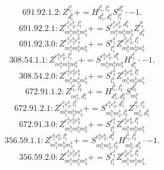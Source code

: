 \documentclass[letterpaper,10pt,fleqn,leqno,onecolumn]{article}
\begin{document}
\begin{equation} \;\;\;\;\;\;  691.92.1.2: Z^{l_{1}^{b}}_{d_{1}^{b}}+=H^{l_{1}^{b},l_{1}^{a}}_{d_{1}^{b},d_{1}^{a}}S^{d_{1}^{a}}_{l_{1}^{a}}\cdot -1. \end{equation}
\begin{equation} \;\;\;\;\;\;  691.92.2.1: Z^{e_{1}^{b}e_{2}^{b},l_{1}^{b}}_{m_{1}^{b}m_{2}^{b}m_{3}^{b}}+=S^{e_{1}^{b}e_{2}^{b},d_{1}^{b}}_{m_{1}^{b}m_{2}^{b}m_{3}^{b}}Z^{l_{1}^{b}}_{d_{1}^{b}} \end{equation}
\begin{equation} \;\;\;\;\;\;  691.92.3.0: Z^{e_{1}^{b}e_{2}^{b}e_{3}^{b}}_{m_{1}^{b}m_{2}^{b}m_{3}^{b}}+=S^{e_{1}^{b}}_{l_{1}^{b}}Z^{e_{2}^{b}e_{3}^{b},l_{1}^{b}}_{m_{1}^{b}m_{2}^{b}m_{3}^{b}} \end{equation}
\begin{equation} \;\;\;\;\;\;  308.54.1.1: Z^{e_{1}^{b}e_{2}^{b},l_{1}^{b}}_{m_{1}^{b}m_{2}^{b}m_{3}^{b}}+=S^{e_{1}^{b}e_{2}^{b},d_{1}^{b}}_{m_{1}^{b}m_{2}^{b}m_{3}^{b}}H^{l_{1}^{b}}_{d_{1}^{b}}\cdot -1. \end{equation}
\begin{equation} \;\;\;\;\;\;  308.54.2.0: Z^{e_{1}^{b}e_{2}^{b}e_{3}^{b}}_{m_{1}^{b}m_{2}^{b}m_{3}^{b}}+=S^{e_{1}^{b}}_{l_{1}^{b}}Z^{e_{2}^{b}e_{3}^{b},l_{1}^{b}}_{m_{1}^{b}m_{2}^{b}m_{3}^{b}} \end{equation}
\begin{equation} \;\;\;\;\;\;  672.91.1.2: Z^{l_{1}^{b},l_{2}^{b}}_{m_{1}^{b},d_{1}^{b}}+=H^{l_{1}^{b},l_{2}^{b}}_{d_{1}^{b},d_{2}^{b}}S^{d_{2}^{b}}_{m_{1}^{b}} \end{equation}
\begin{equation} \;\;\;\;\;\;  672.91.2.1: Z^{e_{1}^{b}e_{2}^{b},l_{1}^{b}}_{m_{1}^{b}m_{2}^{b}m_{3}^{b}}+=S^{e_{1}^{b}e_{2}^{b},d_{1}^{b}}_{m_{1}^{b}m_{2}^{b},l_{2}^{b}}Z^{l_{1}^{b},l_{2}^{b}}_{m_{3}^{b},d_{1}^{b}} \end{equation}
\begin{equation} \;\;\;\;\;\;  672.91.3.0: Z^{e_{1}^{b}e_{2}^{b}e_{3}^{b}}_{m_{1}^{b}m_{2}^{b}m_{3}^{b}}+=S^{e_{1}^{b}}_{l_{1}^{b}}Z^{e_{2}^{b}e_{3}^{b},l_{1}^{b}}_{m_{1}^{b}m_{2}^{b}m_{3}^{b}} \end{equation}
\begin{equation} \;\;\;\;\;\;  356.59.1.1: Z^{e_{1}^{b}e_{2}^{b},l_{1}^{b}}_{m_{1}^{b}m_{2}^{b}m_{3}^{b}}+=S^{e_{1}^{b}e_{2}^{b},d_{1}^{b}}_{m_{1}^{b}m_{2}^{b},l_{2}^{b}}H^{l_{1}^{b},l_{2}^{b}}_{m_{3}^{b},d_{1}^{b}}\cdot -1. \end{equation}
\begin{equation} \;\;\;\;\;\;  356.59.2.0: Z^{e_{1}^{b}e_{2}^{b}e_{3}^{b}}_{m_{1}^{b}m_{2}^{b}m_{3}^{b}}+=S^{e_{1}^{b}}_{l_{1}^{b}}Z^{e_{2}^{b}e_{3}^{b},l_{1}^{b}}_{m_{1}^{b}m_{2}^{b}m_{3}^{b}} \end{equation}
\end{document}
